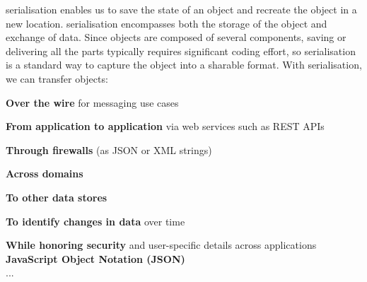 \documentclass[../report.tex]{subfiles}
\begin{document}
serialisation enables us to save the state of an object and recreate the object in a new location. serialisation encompasses both the storage of the object and exchange of data. Since objects are composed of several components, saving or delivering all the parts typically requires significant coding effort, so serialisation is a standard way to capture the object into a sharable format. With serialisation, we can transfer objects:

\textbf{Over the wire} for messaging use cases

\textbf{From application to application} via web services such as REST APIs

\textbf{Through firewalls} (as JSON or XML strings)

\textbf{Across domains}

\textbf{To other data stores}

\textbf{To identify changes in data} over time

\textbf{While honoring security} and user-specific details across applications \\

\textbf{JavaScript Object Notation (JSON)} \\

...
\end{document}
